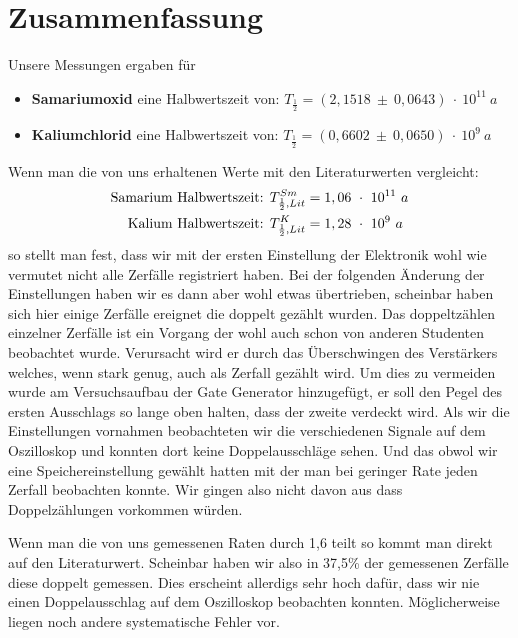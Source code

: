 \documentclass[12pt]{article}
\begin{document}
\section{Zusammenfassung}
Unsere Messungen ergaben für
\begin{itemize}
 \item \textbf{Samariumoxid} eine Halbwertszeit von: $T_{\frac{1}{2}} = (2,1518~\pm~0,0643)~\cdot~10^{11}~a$
 \item \textbf{ Kaliumchlorid }eine Halbwertszeit von: $T_{\frac{1}{2}} = (0,6602~\pm~0,0650)~\cdot~10^9~a$
\end{itemize}
Wenn man die von uns erhaltenen Werte mit den Literaturwerten vergleicht:
\begin{align}
 \notag \textnormal{Samarium Halbwertszeit: }T_{\frac{1}{2}, Lit}^{Sm} &= 1,06~\cdot~10^{11}~a\\
 \notag \textnormal{Kalium Halbwertszeit: }T_{\frac{1}{2}, Lit}^K &= 1,28~\cdot~10^{9}~a
\end{align}
so stellt man fest, dass wir mit der ersten Einstellung der Elektronik wohl wie vermutet nicht alle Zerfälle registriert haben. Bei der folgenden Änderung der Einstellungen haben wir es dann aber wohl etwas übertrieben, scheinbar haben sich hier einige Zerfälle ereignet die doppelt gezählt wurden.
Das doppeltzählen einzelner Zerfälle ist ein Vorgang der wohl auch schon von anderen Studenten beobachtet wurde. Verursacht wird er durch das Überschwingen des Verstärkers welches, wenn stark genug, auch als Zerfall gezählt wird. Um dies zu vermeiden wurde am Versuchsaufbau der Gate Generator hinzugefügt, er soll den Pegel des ersten Ausschlags so lange oben halten, dass der zweite verdeckt wird. Als wir die Einstellungen vornahmen beobachteten wir die verschiedenen Signale auf dem Oszilloskop und konnten dort keine Doppelausschläge sehen. Und das obwol wir eine Speichereinstellung gewählt hatten mit der man bei geringer Rate jeden Zerfall beobachten konnte. Wir gingen also nicht davon aus dass Doppelzählungen vorkommen würden.

Wenn man die von uns gemessenen Raten durch 1,6 teilt so kommt man direkt auf den Literaturwert. Scheinbar haben wir also in 37,5\% der gemessenen Zerfälle diese doppelt gemessen. 
Dies erscheint allerdigs sehr hoch dafür, dass wir nie einen Doppelausschlag auf dem Oszilloskop beobachten konnten. Möglicherweise liegen noch andere systematische Fehler vor.
\end{document}
